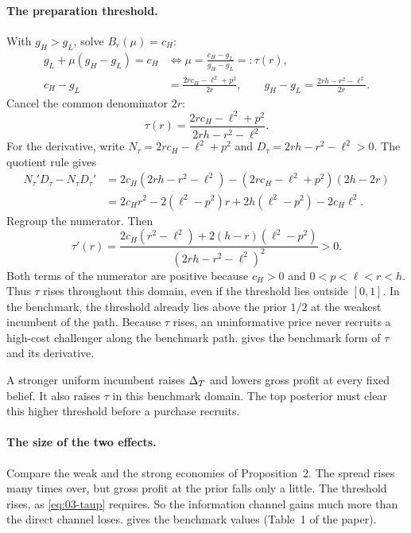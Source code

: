 \paragraph{The preparation threshold.} With \(g_H>g_L\), solve \(B_r(\mu)=c_H\):
\begin{align*}
g_L+\mu(g_H-g_L)=c_H
&\iff \mu=\frac{c_H-g_L}{g_H-g_L}=:\tau(r),\\
c_H-g_L&=\frac{2rc_H-\ell^2+p^2}{2r},\qquad
g_H-g_L=\frac{2rh-r^2-\ell^2}{2r}.
\end{align*}
Cancel the common denominator \(2r\):
\begin{equation}\label{eq:03-tau}
\tau(r)=\frac{2rc_H-\ell^2+p^2}{2rh-r^2-\ell^2}.
\end{equation}
For the derivative, write \(N_\tau=2rc_H-\ell^2+p^2\) and \(D_\tau=2rh-r^2-\ell^2>0\).
The quotient rule gives
\begin{align*}
N_\tau'D_\tau-N_\tau D_\tau'
&=2c_H(2rh-r^2-\ell^2)-(2rc_H-\ell^2+p^2)(2h-2r)\\
&=2c_Hr^2-2(\ell^2-p^2)r+2h(\ell^2-p^2)-2c_H\ell^2.
\end{align*}
Regroup the numerator. Then
\begin{equation}\label{eq:03-taup}
\tau'(r)=\frac{2c_H(r^2-\ell^2)+2(h-r)(\ell^2-p^2)}{(2rh-r^2-\ell^2)^2}>0.
\end{equation}
Both terms of the numerator are positive because \(c_H>0\) and \(0<p<\ell<r<h\).
Thus \(\tau\) rises throughout this domain, even if the threshold lies outside \([0,1]\).
In the benchmark, the threshold already lies above the prior \(1/2\) at the weakest incumbent of the path.
Because \(\tau\) rises, an uninformative price never recruits a high-cost challenger along the benchmark path.
 gives the benchmark form of \(\tau\) and its derivative.

\begin{resultbox}
A stronger uniform incumbent raises \(\Delta_T\) and lowers gross profit at every fixed belief.
It also raises \(\tau\) in this benchmark domain.
The top posterior must clear this higher threshold before a purchase recruits.
\end{resultbox}

\paragraph{The size of the two effects.} Compare the weak and the strong economies of Proposition~2.
The spread rises many times over, but gross profit at the prior falls only a little.
The threshold rises, as \eqref{eq:03-taup} requires.
So the information channel gains much more than the direct channel loses.
 gives the benchmark values (Table~1 of the paper).

